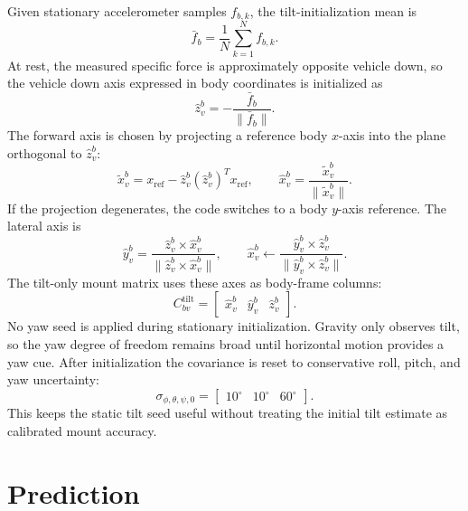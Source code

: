 \documentclass[11pt]{article}
\newcommand{\T}{^{T}}
\begin{document}
Given stationary accelerometer samples \(f_{b,k}\), the tilt-initialization mean is
\begin{equation}
  \bar f_b=\frac{1}{N}\sum_{k=1}^{N}f_{b,k}.
\end{equation}
At rest, the measured specific force is approximately opposite vehicle down, so
the vehicle down axis expressed in body coordinates is initialized as
\begin{equation}
  \hat z_v^b = -\frac{\bar f_b}{\|\bar f_b\|}.
\end{equation}
The forward axis is chosen by projecting a reference body \(x\)-axis into the
plane orthogonal to \(\hat z_v^b\):
\begin{equation}
  \tilde x_v^b = x_{\mathrm{ref}} -
  \hat z_v^b(\hat z_v^b)\T x_{\mathrm{ref}},
  \qquad
  \hat x_v^b=\frac{\tilde x_v^b}{\|\tilde x_v^b\|}.
\end{equation}
If the projection degenerates, the code switches to a body \(y\)-axis reference.
The lateral axis is
\begin{equation}
  \hat y_v^b =
  \frac{\hat z_v^b \times \hat x_v^b}
       {\|\hat z_v^b \times \hat x_v^b\|},
  \qquad
  \hat x_v^b \leftarrow
  \frac{\hat y_v^b \times \hat z_v^b}
       {\|\hat y_v^b \times \hat z_v^b\|}.
\end{equation}
The tilt-only mount matrix uses these axes as body-frame columns:
\begin{equation}
  C_{bv}^{\mathrm{tilt}} =
  \begin{bmatrix}
  \hat x_v^b & \hat y_v^b & \hat z_v^b
  \end{bmatrix}.
\end{equation}
No yaw seed is applied during stationary initialization. Gravity only observes
tilt, so the yaw degree of freedom remains broad until horizontal motion
provides a yaw cue.
After initialization the covariance is reset to conservative roll, pitch, and
yaw uncertainty:
\begin{equation}
  \sigma_{\phi,\theta,\psi,0} =
  \begin{bmatrix}10^\circ & 10^\circ & 60^\circ\end{bmatrix}.
\end{equation}
This keeps the static tilt seed useful without treating the initial
tilt estimate as calibrated mount accuracy.

\section{Prediction}
\end{document}
